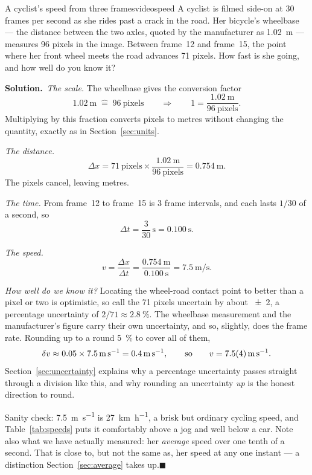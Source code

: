\documentclass[11pt,twoside,openany]{book}
\newcounter{check}[chapter]
\newcommand{\solution}{\par\smallskip\noindent\textbf{Solution.}\ }
\newcommand{\qed}{\hfill$\blacksquare$}
\begin{document}
\begin{example}{A cyclist's speed from three frames}{videospeed}
A cyclist is filmed side-on at \num{30} frames per second as she rides past a crack in the road. Her bicycle's wheelbase --- the distance between the two axles, quoted by the manufacturer as \SI{1.02}{\metre} --- measures \num{96} pixels in the image. Between frame~\num{12} and frame~\num{15}, the point where her front wheel meets the road advances \num{71} pixels. How fast is she going, and how well do you know it?

\solution \emph{The scale.} The wheelbase gives the conversion factor
\[
\SI{1.02}{\metre} \;\widehat{=}\; \num{96}\ \text{pixels}
\qquad\Longrightarrow\qquad
1 = \frac{\SI{1.02}{\metre}}{96\ \text{pixels}} .
\]
Multiplying by this fraction converts pixels to metres without changing the quantity, exactly as in Section~\ref{sec:units}.

\emph{The distance.}
\[
\Delta x = 71\ \text{pixels} \times \frac{\SI{1.02}{\metre}}{96\ \text{pixels}} = \SI{0.754}{\metre}.
\]
The pixels cancel, leaving metres.

\emph{The time.} From frame~\num{12} to frame~\num{15} is \num{3} frame intervals, and each lasts $1/30$ of a second, so
\[
\Delta t = \frac{3}{30}\,\si{\second} = \SI{0.100}{\second}.
\]

\emph{The speed.}
\[
v = \frac{\Delta x}{\Delta t} = \frac{\SI{0.754}{\metre}}{\SI{0.100}{\second}} = \SI{7.5}{\metre\per\second}.
\]

\emph{How well do we know it?} Locating the wheel-road contact point to better than a pixel or two is optimistic, so call the \num{71} pixels uncertain by about \num{\pm 2}, a percentage uncertainty of $2/71 \approx \SI{2.8}{\percent}$. The wheelbase measurement and the manufacturer's figure carry their own uncertainty, and so, slightly, does the frame rate. Rounding up to a round \SI{5}{\percent} to cover all of them,
\[
\delta v \approx 0.05 \times \SI{7.5}{\metre\per\second} = \SI{0.4}{\metre\per\second},
\qquad\text{so}\qquad
v = \SI{7.5 \pm 0.4}{\metre\per\second}.
\]
Section~\ref{sec:uncertainty} explains why a percentage uncertainty passes straight through a division like this, and why rounding an uncertainty \emph{up} is the honest direction to round.

Sanity check: \SI{7.5}{\metre\per\second} is \SI{27}{\kilo\metre\per\hour}, a brisk but ordinary cycling speed, and Table~\ref{tab:speeds} puts it comfortably above a jog and well below a car. Note also what we have actually measured: her \emph{average} speed over one tenth of a second. That is close to, but not the same as, her speed at any one instant --- a distinction Section~\ref{sec:average} takes up.\qed
\end{example}
\end{document}
